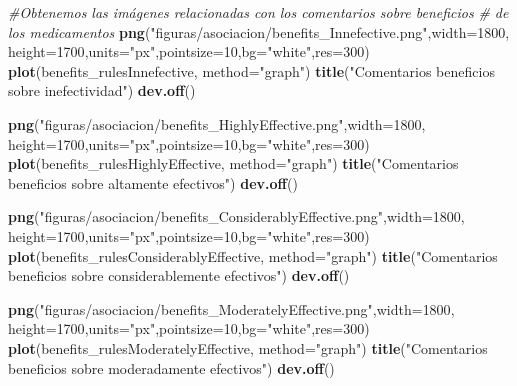 \documentclass[spanish,]{article}
\newenvironment{Shaded}{\begin{snugshade}}{\end{snugshade}}
\newcommand{\KeywordTok}[1]{\textcolor[rgb]{0.13,0.29,0.53}{\textbf{#1}}}
\newcommand{\DataTypeTok}[1]{\textcolor[rgb]{0.13,0.29,0.53}{#1}}
\newcommand{\DecValTok}[1]{\textcolor[rgb]{0.00,0.00,0.81}{#1}}
\newcommand{\StringTok}[1]{\textcolor[rgb]{0.31,0.60,0.02}{#1}}
\newcommand{\CommentTok}[1]{\textcolor[rgb]{0.56,0.35,0.01}{\textit{#1}}}
\newcommand{\NormalTok}[1]{#1}
\begin{document}
\begin{Shaded}
\begin{Highlighting}[]
\CommentTok{#Obtenemos las imágenes relacionadas con los comentarios sobre beneficios}
\CommentTok{# de los medicamentos}
\KeywordTok{png}\NormalTok{(}\StringTok{"figuras/asociacion/benefits_Innefective.png"}\NormalTok{,}\DataTypeTok{width=}\DecValTok{1800}\NormalTok{,}
    \DataTypeTok{height=}\DecValTok{1700}\NormalTok{,}\DataTypeTok{units=}\StringTok{"px"}\NormalTok{,}\DataTypeTok{pointsize=}\DecValTok{10}\NormalTok{,}\DataTypeTok{bg=}\StringTok{"white"}\NormalTok{,}\DataTypeTok{res=}\DecValTok{300}\NormalTok{)}
\KeywordTok{plot}\NormalTok{(benefits_rulesInnefective, }\DataTypeTok{method=}\StringTok{"graph"}\NormalTok{)}
\KeywordTok{title}\NormalTok{(}\StringTok{"Comentarios beneficios sobre inefectividad"}\NormalTok{)}
\KeywordTok{dev.off}\NormalTok{()}

\KeywordTok{png}\NormalTok{(}\StringTok{"figuras/asociacion/benefits_HighlyEffective.png"}\NormalTok{,}\DataTypeTok{width=}\DecValTok{1800}\NormalTok{,}
    \DataTypeTok{height=}\DecValTok{1700}\NormalTok{,}\DataTypeTok{units=}\StringTok{"px"}\NormalTok{,}\DataTypeTok{pointsize=}\DecValTok{10}\NormalTok{,}\DataTypeTok{bg=}\StringTok{"white"}\NormalTok{,}\DataTypeTok{res=}\DecValTok{300}\NormalTok{)}
\KeywordTok{plot}\NormalTok{(benefits_rulesHighlyEffective, }\DataTypeTok{method=}\StringTok{"graph"}\NormalTok{)}
\KeywordTok{title}\NormalTok{(}\StringTok{"Comentarios beneficios sobre altamente efectivos"}\NormalTok{)}
\KeywordTok{dev.off}\NormalTok{()}

\KeywordTok{png}\NormalTok{(}\StringTok{"figuras/asociacion/benefits_ConsiderablyEffective.png"}\NormalTok{,}\DataTypeTok{width=}\DecValTok{1800}\NormalTok{,}
    \DataTypeTok{height=}\DecValTok{1700}\NormalTok{,}\DataTypeTok{units=}\StringTok{"px"}\NormalTok{,}\DataTypeTok{pointsize=}\DecValTok{10}\NormalTok{,}\DataTypeTok{bg=}\StringTok{"white"}\NormalTok{,}\DataTypeTok{res=}\DecValTok{300}\NormalTok{)}
\KeywordTok{plot}\NormalTok{(benefits_rulesConsiderablyEffective, }\DataTypeTok{method=}\StringTok{"graph"}\NormalTok{)}
\KeywordTok{title}\NormalTok{(}\StringTok{"Comentarios beneficios sobre considerablemente efectivos"}\NormalTok{)}
\KeywordTok{dev.off}\NormalTok{()}

\KeywordTok{png}\NormalTok{(}\StringTok{"figuras/asociacion/benefits_ModeratelyEffective.png"}\NormalTok{,}\DataTypeTok{width=}\DecValTok{1800}\NormalTok{,}
    \DataTypeTok{height=}\DecValTok{1700}\NormalTok{,}\DataTypeTok{units=}\StringTok{"px"}\NormalTok{,}\DataTypeTok{pointsize=}\DecValTok{10}\NormalTok{,}\DataTypeTok{bg=}\StringTok{"white"}\NormalTok{,}\DataTypeTok{res=}\DecValTok{300}\NormalTok{)}
\KeywordTok{plot}\NormalTok{(benefits_rulesModeratelyEffective, }\DataTypeTok{method=}\StringTok{"graph"}\NormalTok{)}
\KeywordTok{title}\NormalTok{(}\StringTok{"Comentarios beneficios sobre moderadamente efectivos"}\NormalTok{)}
\KeywordTok{dev.off}\NormalTok{()}


\end{Highlighting}
\end{Shaded}
\end{document}
